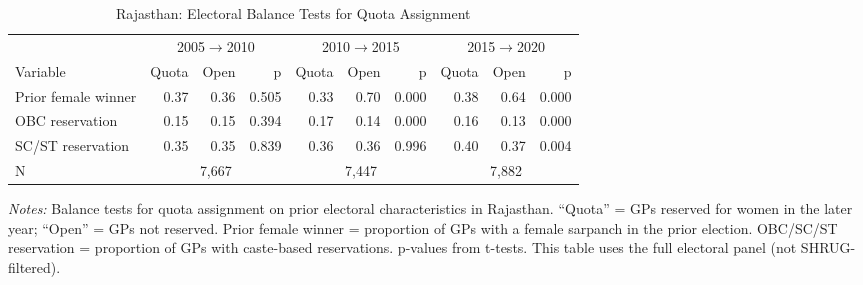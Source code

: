 \begin{table}[htbp]
\caption{Rajasthan: Electoral Balance Tests for Quota Assignment}
\label{tab:balance_electoral_raj}
{\centering\scriptsize
\begin{tabular}{@{}lrrr rrr rrr@{}}
\toprule
& \multicolumn{3}{c}{2005$\rightarrow$2010} & \multicolumn{3}{c}{2010$\rightarrow$2015} & \multicolumn{3}{c}{2015$\rightarrow$2020} \\
\cmidrule(lr){2-4} \cmidrule(lr){5-7} \cmidrule(lr){8-10}
Variable & Quota & Open & p & Quota & Open & p & Quota & Open & p \\
\midrule
Prior female winner & 0.37 & 0.36 & 0.505 & 0.33 & 0.70 & 0.000 & 0.38 & 0.64 & 0.000 \\
OBC reservation & 0.15 & 0.15 & 0.394 & 0.17 & 0.14 & 0.000 & 0.16 & 0.13 & 0.000 \\
SC/ST reservation & 0.35 & 0.35 & 0.839 & 0.36 & 0.36 & 0.996 & 0.40 & 0.37 & 0.004 \\
\midrule
N & \multicolumn{3}{c}{7,667} & \multicolumn{3}{c}{7,447} & \multicolumn{3}{c}{7,882} \\
\bottomrule
\end{tabular}
\par}

\vspace{0.5ex}
\parbox{\linewidth}{\scriptsize \emph{Notes:} Balance tests for quota assignment on prior electoral characteristics in Rajasthan. ``Quota'' = GPs reserved for women in the later year; ``Open'' = GPs not reserved. Prior female winner = proportion of GPs with a female sarpanch in the prior election. OBC/SC/ST reservation = proportion of GPs with caste-based reservations. p-values from t-tests. This table uses the full electoral panel (not SHRUG-filtered).}
\end{table}
